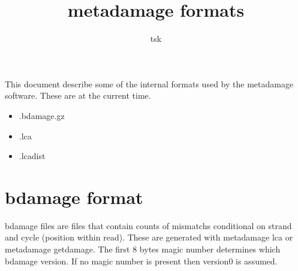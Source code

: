 \documentclass[10pt]{article}
\begin{document}
\title{metadamage formats}
\author{tsk}
\maketitle
\vspace*{1em}

This document describe some of the internal formats used by the metadamage software. These are at the current time.
\begin{itemize}
\item .bdamage.gz
\item .lca
\item .lcadist
\end{itemize}

\section{bdamage format}
bdamage files are files that contain counts of mismatchs conditional on strand and cycle (position within read). These are generated with metadamage lca or metadamage getdamage. 
The first 8 bytes magic number determines which bdamage version. If no magic number is present then version0 is assumed. 
\end{document}
